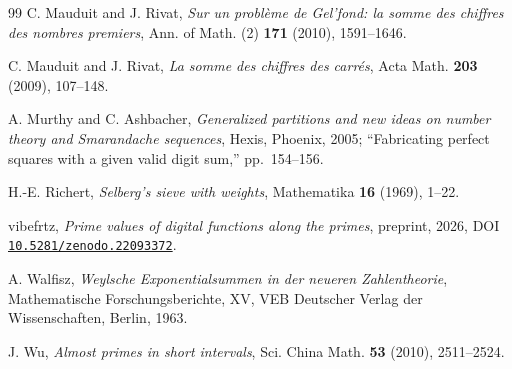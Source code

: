 \documentclass[11pt,reqno]{amsart}
\theoremstyle{plain}
\theoremstyle{definition}
\begin{document}
\begin{thebibliography}{99}
 C. Mauduit and J. Rivat, \emph{Sur un probl\`eme de Gel'fond: la somme des chiffres des nombres premiers}, Ann. of Math. (2) \textbf{171} (2010), 1591--1646.

 C. Mauduit and J. Rivat, \emph{La somme des chiffres des carr\'es}, Acta Math. \textbf{203} (2009), 107--148.

 A. Murthy and C. Ashbacher, \emph{Generalized partitions and new ideas on number theory and Smarandache sequences}, Hexis, Phoenix, 2005; ``Fabricating perfect squares with a given valid digit sum,'' pp.~154--156.

 H.-E. Richert, \emph{Selberg's sieve with weights}, Mathematika \textbf{16} (1969), 1--22.

 vibefrtz, \emph{Prime values of digital functions along the primes}, preprint, 2026, DOI \href{https://doi.org/10.5281/zenodo.22093372}{\texttt{10.5281/zenodo.22093372}}.

 A. Walfisz, \emph{Weylsche Exponentialsummen in der neueren Zahlentheorie}, Mathematische Forschungsberichte, XV, VEB Deutscher Verlag der Wissenschaften, Berlin, 1963.

 J. Wu, \emph{Almost primes in short intervals}, Sci. China Math. \textbf{53} (2010), 2511--2524.

\end{thebibliography}
\end{document}
